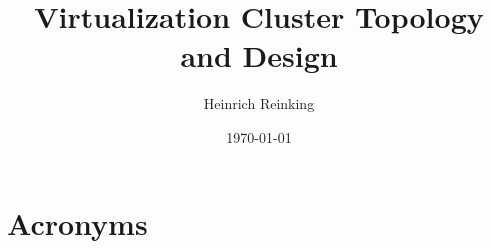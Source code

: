 \documentclass[PMO,authoryear,toc]{lsstdoc}
\title{Virtualization Cluster Topology and Design}
\author{%
Heinrich Reinking
}
\date {\today}
\begin{document}
\maketitle



\appendix
\renewcommand{\refname}{} %


\section{Acronyms} \label{sec:acronyms}

\end{document}
